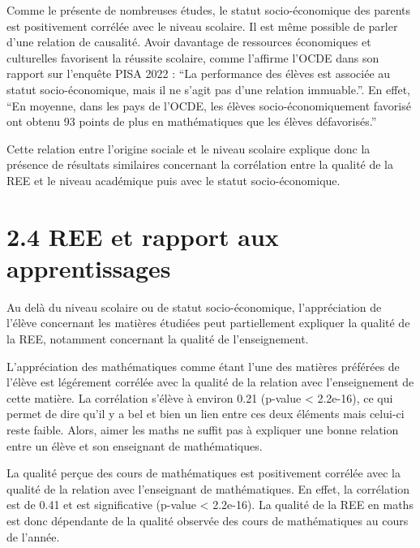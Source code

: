 \documentclass[
  french,
  11pt,
  a4paper,
  oneside]{report}
\begin{document}
\begin{tcolorbox}[enhanced jigsaw, bottomrule=.15mm, opacitybacktitle=0.6, left=2mm, colframe=quarto-callout-note-color-frame, title={Lien entre le statut socio-économique et le niveau scolaire des élèves}, breakable, coltitle=black, colbacktitle=quarto-callout-note-color!10!white, toptitle=1mm, rightrule=.15mm, opacityback=0, colback=white, leftrule=.75mm, toprule=.15mm, titlerule=0mm, arc=.35mm, bottomtitle=1mm]

Comme le présente de nombreuses études, le statut socio-économique des
parents est positivement corrélée avec le niveau scolaire. Il est même
possible de parler d'une relation de causalité. Avoir davantage de
ressources économiques et culturelles favorisent la réussite scolaire,
comme l'affirme l'OCDE dans son rapport sur l'enquête PISA 2022 : ``La
performance des élèves est associée au statut socio-économique, mais il
ne s'agit pas d'une relation immuable.''. En effet, ``En moyenne, dans
les pays de l'OCDE, les élèves socio-économiquement favorisé ont obtenu
93 points de plus en mathématiques que les élèves défavorisés.''

Cette relation entre l'origine sociale et le niveau scolaire explique
donc la présence de résultats similaires concernant la corrélation entre
la qualité de la REE et le niveau académique puis avec le statut
socio-économique.

\end{tcolorbox}

\section{2.4 REE et rapport aux
apprentissages}\label{ree-et-rapport-aux-apprentissages}

Au delà du niveau scolaire ou de statut socio-économique, l'appréciation
de l'élève concernant les matières étudiées peut partiellement expliquer
la qualité de la REE, notamment concernant la qualité de l'enseignement.

L'appréciation des mathématiques comme étant l'une des matières
préférées de l'élève est légérement corrélée avec la qualité de la
relation avec l'enseignement de cette matière. La corrélation s'élève à
environ 0.21 (p-value \textless{} 2.2e-16), ce qui permet de dire qu'il
y a bel et bien un lien entre ces deux éléments mais celui-ci reste
faible. Alors, aimer les maths ne suffit pas à expliquer une bonne
relation entre un élève et son enseignant de mathématiques.

La qualité perçue des cours de mathématiques est positivement corrélée
avec la qualité de la relation avec l'enseignant de mathématiques. En
effet, la corrélation est de 0.41 et est significative (p-value
\textless{} 2.2e-16). La qualité de la REE en maths est donc dépendante
de la qualité observée des cours de mathématiques au cours de l'année.
\end{document}
